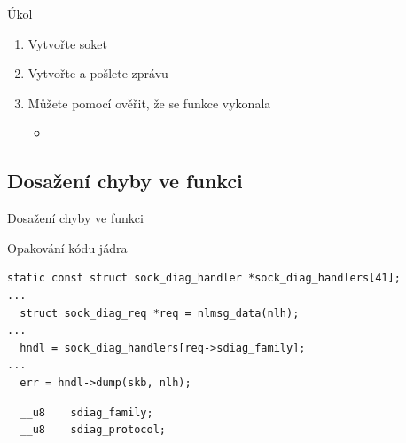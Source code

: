 \begin{frame}{Úkol}

  \begin{enumerate}
    \item Vytvořte soket
    \item Vytvořte a pošlete zprávu
    \item Můžete pomocí  ověřit, že se funkce vykonala
    \begin{itemize}
      \item {}
    \end{itemize}
  \end{enumerate}

\end{frame}

\subsection{Dosažení chyby ve funkci}
\frame{\subsectionpage}

\begin{frame}[fragile]{Dosažení chyby ve funkci}

  \begin{block}{Opakování kódu jádra}
  \begin{lstlisting}
static const struct sock_diag_handler *sock_diag_handlers[41];
...
  struct sock_diag_req *req = nlmsg_data(nlh);
...
  hndl = sock_diag_handlers[req->sdiag_family];
...
  err = hndl->dump(skb, nlh);
\end{lstlisting}
  \end{block}

  \pause

  \begin{block}{}
  \begin{lstlisting}
  __u8    sdiag_family;
  __u8    sdiag_protocol;
\end{lstlisting}
  \end{block}

\end{frame}

